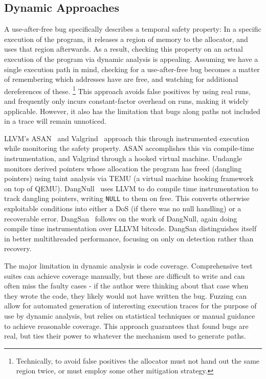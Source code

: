 \subsection{Dynamic Approaches}
A use-after-free bug specifically describes a temporal safety property:
In a specific execution of the program, it releases a region of memory to the allocator, and uses that region afterwards.
As a result, checking this property on an actual execution of the program via dynamic analysis is appealing.
Assuming we have a single execution path in mind, checking for a use-after-free bug becomes a matter of remembering which addresses have are free, and watching for additional dereferences of these.
\footnote{Technically, to avoid false positives the allocator must not hand out the same region twice, or must employ some other mitigation strategy.}
This approach avoids false positives by using real runs, and frequently only incurs constant-factor overhead on runs, making it widely applicable.
However, it also has the limitation that bugs along paths not included in a trace will remain unnoticed.

LLVM's ASAN~\cite{asan} and Valgrind~\cite{valgrind} approach this through instrumented execution while monitoring the safety property.
ASAN accomplishes this via compile-time instrumentation, and Valgrind through a hooked virtual machine.
Undangle~\cite{undangle} monitors derived pointers whose allocation the program has freed (dangling pointers) using taint analysis via TEMU (a virtual machine hooking framework on top of QEMU).
DangNull~\cite{dangnull} uses LLVM to do compile time instrumentation to track dangling pointers, writing \texttt{NULL} to them on free.
This converts otherwise exploitable conditions into either a DoS (if there was no null handling) or a recoverable error.
DangSan~\cite{dangsan} follows on the work of DangNull, again doing compile time instrumentation over LLLVM bitcode.
DangSan distinguishes itself in better multithreaded performance, focusing on only on detection rather than recovery.

The major limitation in dynamic analysis is code coverage.
Comprehensive test suites can achieve coverage manually, but these are difficult to write and can often miss the faulty cases - if the author were thinking about that case when they wrote the code, they likely would not have written the bug.
Fuzzing can allow for automated generation of interesting execution traces for the purpose of use by dynamic analysis, but relies on statistical techniques or manual guidance to achieve reasonable coverage.
This approach guarantees that found bugs are real, but ties their power to whatever the mechanism used to generate paths.

